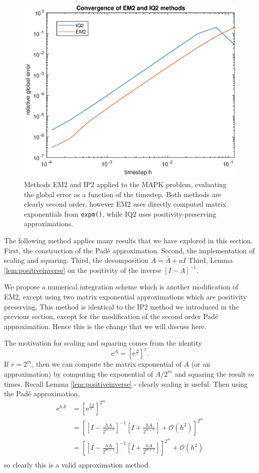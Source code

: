 \begin{figure}
    \centering
    \includegraphics[width=0.75\linewidth]{Matlab/positivemapk.eps}
    \caption{
        Methods EM2 and IP2 applied to the MAPK problem, evaluating the global error as a function of the timestep.
        Both methods are clearly second order, however EM2 uses directly computed matrix exponentials from \texttt{expm()},
        while IQ2 uses positivity-preserving approximations.
    }
    \label{fig:pademapkpos}
\end{figure}

The following method applies many results that we have explored in this section.
First, the construction of the Pad\'e approximation.
Second, the implementation of scaling and squaring.
Third, the decomposition $A = \bar{A} + a I$
Third, Lemma \ref{lem:positiveinverse} on the positivity of the inverse $[I - A]^{-1}$.

We propose a numerical integration scheme which is another modification of EM2, except using two matrix exponential approximations which are positivity preserving.
This method is identical to the IP2 method we introduced in the previous section, except for the modification of the second order Pad\'e approximation.
Hence this is the change that we will discuss here.

The motivation for scaling and squaring comes from the identity 
\begin{equation*}
    \mathrm{e}^A = \left[ \mathrm{e}^\frac{A}{r} \right]^r.
\end{equation*}
If $r = 2^m$, then we can compute the matrix exponential of $A$ (or an approximation) by computing the exponential of $A/2^m$ and squaring the result $m$ times.
Recall Lemma \ref{lem:positiveinverse} - clearly scaling is useful.
Then using the Pad\'e approximation,
\begin{align*}
    \mathrm{e}^{hA} &= \left[ \mathrm{e}^\frac{hA}{2^m} \right]^{2^m} \\
    &= \left[
        \left[ I - \frac{hA}{2^{m+1}} \right]^{-1} \left[ I + \frac{hA}{2^{m+1}} \right] + \mathcal{O}(h^2)
    \right]^{2^m} \\
    &= \left[
        \left[ I - \frac{hA}{2^{m+1}} \right]^{-1} \left[ I + \frac{hA}{2^{m+1}} \right]
    \right]^{2^m} + \mathcal{O}(h^2) \\
\end{align*} 
so clearly this is a valid approximation method.

